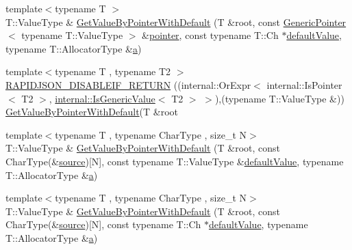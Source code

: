 \begin{DoxyCompactItemize}
\item 
{\footnotesize template$<$typename T $>$ }\\T\+::\+Value\+Type \& \mbox{\hyperlink{namespacerapidjson_a43b1387c2ed5f7dc204d06ffaa9c55d0}{Get\+Value\+By\+Pointer\+With\+Default}} (T \&root, const \mbox{\hyperlink{classrapidjson_1_1_generic_pointer}{Generic\+Pointer}}$<$ typename T\+::\+Value\+Type $>$ \&\mbox{\hyperlink{namespacerapidjson_aa5b8c07c8721afe6870a0210820ea19d}{pointer}}, const typename T\+::\+Ch $\ast$\mbox{\hyperlink{namespacerapidjson_a1591a36fec4c563e57394458a2fc508d}{default\+Value}}, typename T\+::\+Allocator\+Type \&\mbox{\hyperlink{namespacerapidjson_a11fce64e721729aaf6be4a485c78f231}{a}})
\item 
{\footnotesize template$<$typename T , typename T2 $>$ }\\\mbox{\hyperlink{namespacerapidjson_ad218ff941d55a64aaaea0c8658d4462f}{R\+A\+P\+I\+D\+J\+S\+O\+N\+\_\+\+D\+I\+S\+A\+B\+L\+E\+I\+F\+\_\+\+R\+E\+T\+U\+RN}} ((internal\+::\+Or\+Expr$<$ internal\+::\+Is\+Pointer$<$ T2 $>$, \mbox{\hyperlink{structrapidjson_1_1internal_1_1_is_generic_value}{internal\+::\+Is\+Generic\+Value}}$<$ T2 $>$ $>$),(typename T\+::\+Value\+Type \&)) \mbox{\hyperlink{namespacerapidjson_aa33a1f9cd33ac3f6f2af3f90028fee6e}{Get\+Value\+By\+Pointer\+With\+Default}}(T \&root
\item 
{\footnotesize template$<$typename T , typename Char\+Type , size\+\_\+t N$>$ }\\T\+::\+Value\+Type \& \mbox{\hyperlink{namespacerapidjson_a4dba118d81ceb01ff22efb3e5e988dc1}{Get\+Value\+By\+Pointer\+With\+Default}} (T \&root, const Char\+Type(\&\mbox{\hyperlink{namespacerapidjson_a37a3d95ab06aa7542487bb76e704885c}{source}})\mbox{[}N\mbox{]}, const typename T\+::\+Value\+Type \&\mbox{\hyperlink{namespacerapidjson_a1591a36fec4c563e57394458a2fc508d}{default\+Value}}, typename T\+::\+Allocator\+Type \&\mbox{\hyperlink{namespacerapidjson_a11fce64e721729aaf6be4a485c78f231}{a}})
\item 
{\footnotesize template$<$typename T , typename Char\+Type , size\+\_\+t N$>$ }\\T\+::\+Value\+Type \& \mbox{\hyperlink{namespacerapidjson_ac91ec0a49e7d5f976da9a1775b1ec501}{Get\+Value\+By\+Pointer\+With\+Default}} (T \&root, const Char\+Type(\&\mbox{\hyperlink{namespacerapidjson_a37a3d95ab06aa7542487bb76e704885c}{source}})\mbox{[}N\mbox{]}, const typename T\+::\+Ch $\ast$\mbox{\hyperlink{namespacerapidjson_a1591a36fec4c563e57394458a2fc508d}{default\+Value}}, typename T\+::\+Allocator\+Type \&\mbox{\hyperlink{namespacerapidjson_a11fce64e721729aaf6be4a485c78f231}{a}})

\end{DoxyCompactItemize}
